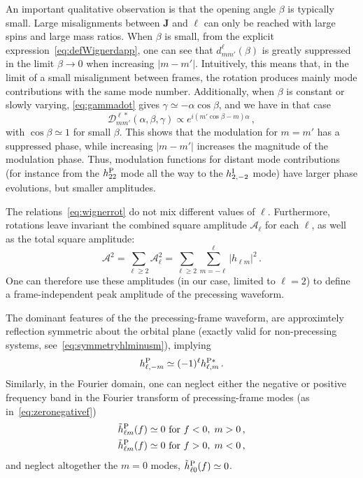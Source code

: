 \documentclass[aps,showpacs,twocolumn,
prd,superscriptaddress,nofootinbib]{revtex4-1}
\newcommand{\be}{\begin{equation}}
\newcommand{\ee}{\end{equation}}
\newcommand\calD{{\mathcal{D}}}
\newcommand\calA{{\mathcal{A}}}
\newcommand{\nn}{\nonumber}
\newcommand{\jgb}[1]{{\color{DarkGreen} #1}}
\begin{document}
\jgb{An important qualitative observation is that the opening angle $\beta$ is typically small. Large misalignments between $\bm{J}$ and $\bm{\ell}$ can only be reached with large spins and large mass ratios. When $\beta$ is small,} from the explicit expression~\eqref{eq:defWignerdapp}, one can see that $d^{\ell}_{mm'}(\beta)$ is greatly suppressed in the limit $\beta \rightarrow 0$ when increasing $|m-m'|$. Intuitively, this means that, in the limit of a small misalignment between frames, the rotation produces mainly mode contributions with the same mode number. Additionally, when $\beta$ is constant or slowly varying, \eqref{eq:gammadot} gives $\gamma \simeq - \alpha \cos\beta$, and we have in that case
\be\label{eq:wignerphasesimpleprec}
	\calD^{\ell *}_{mm'} (\alpha, \beta, \gamma) \propto e^{i(m' \cos\beta - m) \alpha} \,,
\ee
with $\cos\beta \simeq 1$ for small $\beta$. This shows that the modulation for $m=m'$ has a suppressed phase, while increasing $|m-m'|$ increases the magnitude of the modulation phase. Thus, modulation functions for distant mode contributions (for instance from the $h^{\rm P}_{22}$ mode all the way to the $h^{\rm I}_{2,-2}$ mode) have larger phase evolutions, but smaller amplitudes.

The relations~\eqref{eq:wignerrot} do not mix different values of $\ell$. Furthermore, rotations leave invariant the combined square amplitude $\calA_{\ell}$ for each $\ell$, as well as the total square amplitude:
\be\label{eq:defsumamplitude}
	\calA^{2} = \sum\limits_{\ell \geq 2}\calA_{\ell}^{2} = \sum\limits_{\ell \geq 2}\sum\limits_{m=-\ell}^{\ell} |h_{\ell m}|^{2} \,.
\ee
One can therefore use these amplitudes (in our case, limited to $\ell = 2$) to define a frame-independent peak amplitude of the precessing waveform.

\jgb{The dominant features of the the precessing-frame waveform, are approximtely reflection symmetric about the orbital plane (exactly valid for non-precessing systems, see~\eqref{eq:symmetryhlminusm}), implying}
\be\label{eq:approxsymmetryhlminusm}
	h^{\rm P}_{\ell,-m} \simeq (-1)^{\ell} h^{\rm P*}_{\ell,m} \,.
\ee
Similarly, in the Fourier domain, one can neglect either the negative or positive frequency band in the Fourier transform of precessing-frame modes (as in~\eqref{eq:zeronegativef})
\begin{align}\label{eq:approxzeronegativef}
	\tilde{h}_{\ell m}^{\rm P} (f) &\simeq 0 \text{ for } f<0, \; m>0 \nn\,,\\
	\tilde{h}_{\ell m}^{\rm P} (f) &\simeq 0 \text{ for } f>0, \; m<0 \,,
\end{align}
and neglect altogether the $m=0$ modes, $\tilde{h}_{\ell 0}^{\rm P} (f) \simeq 0$.
\end{document}
